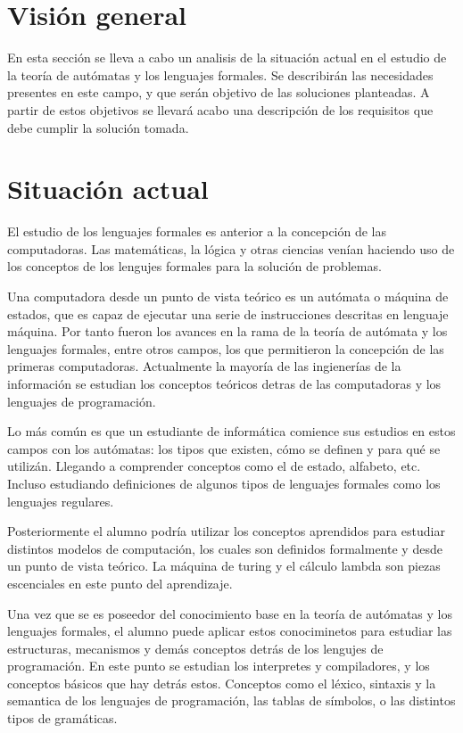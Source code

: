 \section {Visión general}
En esta sección se lleva a cabo un analisis de la situación actual en el estudio de la teoría de autómatas y los lenguajes formales. 
Se describirán las necesidades presentes en este campo, y que serán objetivo de las soluciones planteadas. A partir de estos objetivos se llevará 
acabo una descripción de los requisitos que debe cumplir la solución tomada. 

\section{Situación actual}

El estudio de los lenguajes formales es anterior a la concepción de las computadoras. Las matemáticas, la lógica y otras ciencias venían haciendo 
uso de los conceptos de los lengujes formales para la solución de problemas. 

Una computadora desde un punto de vista teórico es un autómata o máquina de estados, que es capaz de ejecutar una serie de instrucciones descritas
en lenguaje máquina. Por tanto fueron los avances en la rama de la teoría de autómata y los lenguajes formales, entre otros campos, los que permitieron la concepción de 
las primeras computadoras. Actualmente la mayoría de las ingienerías de la información se estudian los conceptos teóricos detras de las computadoras 
y los lenguajes de programación.

Lo más común es que un estudiante de informática comience sus estudios en estos campos con los autómatas: los tipos que existen, cómo se definen 
y para qué se utilizán. Llegando a comprender conceptos como el de estado, alfabeto, etc. Incluso estudiando definiciones de algunos tipos de lenguajes 
formales como los lenguajes regulares.  

Posteriormente el alumno podría utilizar los conceptos aprendidos para estudiar distintos modelos de computación, los cuales son definidos formalmente y desde un punto de vista teórico.
La máquina de turing y el cálculo lambda son piezas escenciales en este punto del aprendizaje. 

Una vez que se es poseedor del conocimiento base en la teoría de autómatas y los lenguajes formales, el alumno puede aplicar estos conociminetos para estudiar las estructuras, mecanismos 
y demás conceptos detrás de los lengujes de programación. En este punto se estudian los interpretes y compiladores, y los 
conceptos básicos que hay detrás estos. Conceptos como el léxico, sintaxis y la semantica de los lenguajes de programación, las tablas de símbolos, o las distintos tipos de gramáticas. 

